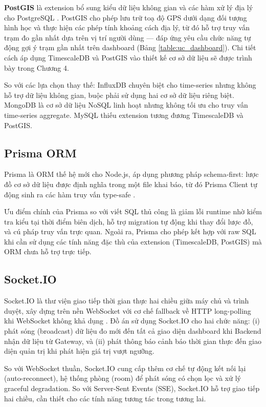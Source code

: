 \documentclass[../DoAn.tex]{subfiles}
\begin{document}
\textbf{PostGIS} là extension bổ sung kiểu dữ liệu không gian và các hàm xử lý địa lý cho PostgreSQL \cite{postgis2024}. PostGIS cho phép lưu trữ toạ độ \gls{GPS} dưới dạng đối tượng hình học và thực hiện các phép tính khoảng cách địa lý, từ đó hỗ trợ truy vấn trạm đo gần nhất dựa trên vị trí người dùng — đáp ứng yêu cầu chức năng tự động gợi ý trạm gần nhất trên dashboard (Bảng \ref{table:uc_dashboard}). Chi tiết cách áp dụng TimescaleDB và PostGIS vào thiết kế cơ sở dữ liệu sẽ được trình bày trong Chương 4.

So với các lựa chọn thay thế: InfluxDB chuyên biệt cho time-series nhưng không hỗ trợ dữ liệu không gian, buộc phải sử dụng hai cơ sở dữ liệu riêng biệt. MongoDB là cơ sở dữ liệu NoSQL linh hoạt nhưng không tối ưu cho truy vấn time-series aggregate. MySQL thiếu extension tương đương TimescaleDB và PostGIS.

\subsection{Prisma ORM}
\label{subsection:3.4.3}

Prisma là \gls{ORM} thế hệ mới cho Node.js, áp dụng phương pháp schema-first: lược đồ cơ sở dữ liệu được định nghĩa trong một file khai báo, từ đó Prisma Client tự động sinh ra các hàm truy vấn type-safe \cite{prisma2024}.

Ưu điểm chính của Prisma so với viết SQL thủ công là giảm lỗi runtime nhờ kiểm tra kiểu tại thời điểm biên dịch, hỗ trợ migration tự động khi thay đổi lược đồ, và cú pháp truy vấn trực quan. Ngoài ra, Prisma cho phép kết hợp với raw SQL khi cần sử dụng các tính năng đặc thù của extension (TimescaleDB, PostGIS) mà ORM chưa hỗ trợ trực tiếp.

\subsection{Socket.IO}
\label{subsection:3.4.4}

Socket.IO là thư viện giao tiếp thời gian thực hai chiều giữa máy chủ và trình duyệt, xây dựng trên nền WebSocket với cơ chế fallback về HTTP long-polling khi WebSocket không khả dụng \cite{socketio2024}. Đồ án sử dụng Socket.IO cho hai chức năng: (i) phát sóng (broadcast) dữ liệu đo mới đến tất cả giao diện dashboard khi Backend nhận dữ liệu từ Gateway, và (ii) phát thông báo cảnh báo thời gian thực đến giao diện quản trị khi phát hiện giá trị vượt ngưỡng.

So với WebSocket thuần, Socket.IO cung cấp thêm cơ chế tự động kết nối lại (auto-reconnect), hệ thống phòng (room) để phát sóng có chọn lọc và xử lý graceful degradation. So với Server-Sent Events (SSE), Socket.IO hỗ trợ giao tiếp hai chiều, cần thiết cho các tính năng tương tác trong tương lai.
\end{document}
